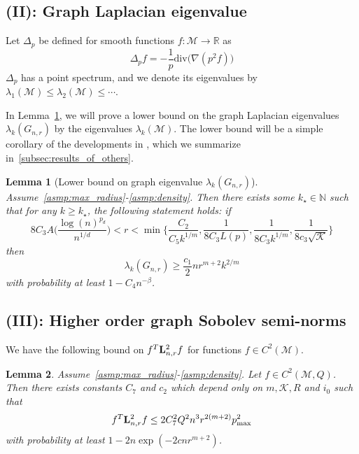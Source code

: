 \documentclass{article}
\newcommand{\Reals}{\mathbb{R}}
\newcommand{\1}{\mathbf{1}}
\newcommand{\Lap}{{\bf L}}
\newcommand{\mc}[1]{\mathcal{#1}}
\theoremstyle{alden}
\theoremstyle{aldenthm}
\newtheorem{lemma}{Lemma}
\theoremstyle{definition}
\theoremstyle{remark}
\begin{document}
\subsection{(II): Graph Laplacian eigenvalue}
Let $\Delta_{p}$ be defined for smooth functions $f: \mc{M} \to \Reals$ as
\begin{equation*}
\Delta_pf = -\frac{1}{p} \mathrm{div}\bigl(\nabla(p^2 f)\bigr)
\end{equation*}
$\Delta_p$ has a point spectrum, and we denote its eigenvalues by $\lambda_1(\mc{M}) \leq \lambda_2(\mc{M}) \leq \cdots$. 

In Lemma~\ref{lem:graph_eigenvalue_manifold}, we will prove a lower bound on the graph Laplacian eigenvalues $\lambda_k(G_{n,r})$ by the eigenvalues $\lambda_k(\mc{M})$. The lower bound will be a simple corollary of the developments in \citep{trillos2019}, which we summarize in~\ref{subsec:results_of_others}. 

\begin{lemma}[Lower bound on graph eigenvalue $\lambda_k(G_{n,r})$]
	\label{lem:graph_eigenvalue_manifold}
	Assume~\ref{asmp:max_radius}-\ref{asmp:density}. Then there exists some $k_{\star} \in \mathbb{N}$ such that for any $k \geq k_{\star}$, the following statement holds: if
	\begin{equation*}
	8 C_3 A \biggl(\frac{\log(n)^{p_d}}{n^{1/d}}\biggr) < r < \min\biggl\{\frac{C_2}{C_5 k^{1/m}}, \frac{1}{8C_3 L(p)}, \frac{1}{8C_3k^{1/m}}, \frac{1}{8c_3\sqrt{\mc{K}}}\biggr\}
	\end{equation*}
	then
	\begin{equation*}
	\lambda_k(G_{n,r}) \geq \frac{c_1}{2} n r^{m + 2} k^{2/m}
	\end{equation*}
	with probability at least $1 - C_4 n^{-\beta}$.
\end{lemma}

\subsection{(III): Higher order graph Sobolev semi-norms}

We have the following bound on $f^T \Lap_{n,r}^2 f$ for functions $f \in C^2(\mc{M})$.
\begin{lemma}
	\label{lem:graph_sobolev_seminorm_2}
	Assume~\ref{asmp:max_radius}-\ref{asmp:density}. Let $f \in C^2(\mc{M},Q)$. Then there exists constants $C_7$ and $c_2$ which depend only on $m,\mc{K},R$ and $i_0$ such that
	\begin{equation*}
	f^T \Lap_{n,r}^2 f \leq 2 C_7^2 Q^2 n^3 r^{2(m + 2)} p_{\max}^2
	\end{equation*}
	with probability at least $1 - 2n\exp(-2cnr^{m + 2})$. 
\end{lemma}
\end{document}
